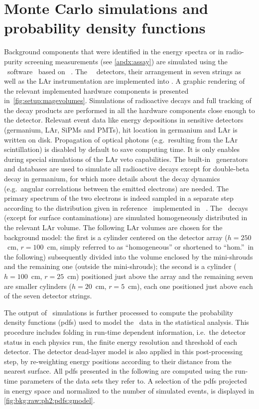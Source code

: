 
\chapter{Monte Carlo simulations and probability density functions}%
\label{apdx:magepdfs}

Background components that were identified in the energy spectra or in
radio-purity screening measurements (see \cref{apdx:assay}) are
simulated using the \mage\ software~\cite{Boswell2011} based on
\geant~\cite{Agostinelli2002, Allison2006, Allison2016}.  The \gerda\
\phasetwo\ detectors, their arrangement in seven strings as well as the
LAr instrumentation are implemented into \mage. A graphic rendering of
the relevant implemented hardware components is presented
in~\cref{fig:setup:magevolumes}.
\newpar
Simulations of radioactive decays and full tracking of the decay
products are performed in all the hardware components close enough to
the detector. Relevant event data like energy depositions in sensitive
detectors (germanium, LAr, SiPMs and PMTs), hit location in germanium
and LAr is written on disk. Propagation of optical photons
(e.g.~resulting from the LAr scintillation) is disabled by default to
save computing time. It is only enables during special simulations of
the LAr veto capabilities.  The built-in \geant\ generators and
databases are used to simulate all radioactive decays except for
double-beta decay in germanium, for which more details about the decay
dynamics (e.g.~angular correlations between the emitted electrons) are
needed. The primary spectrum of the two electrons is indeed sampled in a
separate step according to the distribution given in
reference~\cite{Tretyak1995} implemented in
\decayzero~\cite{Ponkratenko2000}.
\newpar
The \kvz\ decays (except for surface contaminations) are simulated
homogeneously distributed in the relevant LAr volume. The following LAr
volumes are chosen for the background model: the first is a cylinder
centered on the detector array ($h=250$~cm, $r=100$~cm, simply referred
to as ``homogeneous'' or shortened to ``hom.''~in the following)
subsequently divided into the volume enclosed by the mini-shrouds and
the remaining one (outside the mini-shrouds); the second is a cylinder
($h=100$~cm, $r=25$~cm) positioned just above the array and the
remaining seven are smaller cylinders ($h=20$~cm, $r=5$~cm), each one
positioned just above each of the seven detector strings.

The output of \mage\ simulations is further processed to compute the
probability density functions (pdfs) used to model the \gerda\ data in
the statistical analysis. This procedure includes folding in run-time
dependent information, i.e.~the detector status in each physics run, the
finite energy resolution and threshold of each detector. The detector
dead-layer model is also applied in this post-processing step, by
re-weighting energy positions according to their distance from the
nearest surface. All pdfs presented in the following are computed using
the run-time parameters of the data sets they refer to. A selection of
the pdfs projected in energy space and normalized to the number of
simulated events, is displayed in \cref{fig:bkg:raw:ph2:pdfs:gmodel}.

